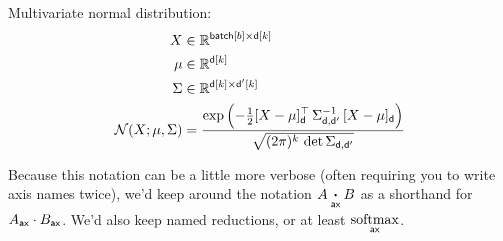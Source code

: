 Multivariate normal distribution:
\begin{align*} 
X &\in \mathbb{R}^{\nset{batch}{{b}} \times \nset{d}{{k}}}  \\
\mu &\in \mathbb{R}^{{\nset{d}{{k}}}}  \\
\Sigma & \in   \mathbb{R}^{{\nset{d}{k} \times \nset{d'}{k}}}  \\
{\cal N}(X; \mu, \Sigma) &= \frac{\displaystyle \exp\left(-\tfrac{1}{2} [X - \mu]_{\name{d}}^\top \, \Sigma_{\name{d},\name{d'}}^{-1} \, [X - \mu]_{\name{d}} \right)}{\sqrt{(2 \pi)^k \, \mathop{\text{det}} \Sigma_{\name{d},\name{d'}}}}
\end{align*}

Because this notation can be a little more verbose (often requiring you to write axis names twice), we'd keep around the notation $A \ndot{ax} B$ as a shorthand for $A_{\name{ax}} \cdot B_{\name{ax}}$. We'd also keep named reductions, or at least $\nfun{ax}{softmax}$.

